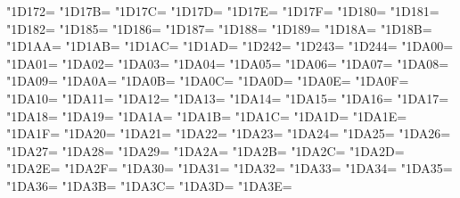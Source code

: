 \XeTeXcharclass"1D172=\KclassCM
\XeTeXcharclass"1D17B=\KclassCM
\XeTeXcharclass"1D17C=\KclassCM
\XeTeXcharclass"1D17D=\KclassCM
\XeTeXcharclass"1D17E=\KclassCM
\XeTeXcharclass"1D17F=\KclassCM
\XeTeXcharclass"1D180=\KclassCM
\XeTeXcharclass"1D181=\KclassCM
\XeTeXcharclass"1D182=\KclassCM
\XeTeXcharclass"1D185=\KclassCM
\XeTeXcharclass"1D186=\KclassCM
\XeTeXcharclass"1D187=\KclassCM
\XeTeXcharclass"1D188=\KclassCM
\XeTeXcharclass"1D189=\KclassCM
\XeTeXcharclass"1D18A=\KclassCM
\XeTeXcharclass"1D18B=\KclassCM
\XeTeXcharclass"1D1AA=\KclassCM
\XeTeXcharclass"1D1AB=\KclassCM
\XeTeXcharclass"1D1AC=\KclassCM
\XeTeXcharclass"1D1AD=\KclassCM
\XeTeXcharclass"1D242=\KclassCM
\XeTeXcharclass"1D243=\KclassCM
\XeTeXcharclass"1D244=\KclassCM
\XeTeXcharclass"1DA00=\KclassCM
\XeTeXcharclass"1DA01=\KclassCM
\XeTeXcharclass"1DA02=\KclassCM
\XeTeXcharclass"1DA03=\KclassCM
\XeTeXcharclass"1DA04=\KclassCM
\XeTeXcharclass"1DA05=\KclassCM
\XeTeXcharclass"1DA06=\KclassCM
\XeTeXcharclass"1DA07=\KclassCM
\XeTeXcharclass"1DA08=\KclassCM
\XeTeXcharclass"1DA09=\KclassCM
\XeTeXcharclass"1DA0A=\KclassCM
\XeTeXcharclass"1DA0B=\KclassCM
\XeTeXcharclass"1DA0C=\KclassCM
\XeTeXcharclass"1DA0D=\KclassCM
\XeTeXcharclass"1DA0E=\KclassCM
\XeTeXcharclass"1DA0F=\KclassCM
\XeTeXcharclass"1DA10=\KclassCM
\XeTeXcharclass"1DA11=\KclassCM
\XeTeXcharclass"1DA12=\KclassCM
\XeTeXcharclass"1DA13=\KclassCM
\XeTeXcharclass"1DA14=\KclassCM
\XeTeXcharclass"1DA15=\KclassCM
\XeTeXcharclass"1DA16=\KclassCM
\XeTeXcharclass"1DA17=\KclassCM
\XeTeXcharclass"1DA18=\KclassCM
\XeTeXcharclass"1DA19=\KclassCM
\XeTeXcharclass"1DA1A=\KclassCM
\XeTeXcharclass"1DA1B=\KclassCM
\XeTeXcharclass"1DA1C=\KclassCM
\XeTeXcharclass"1DA1D=\KclassCM
\XeTeXcharclass"1DA1E=\KclassCM
\XeTeXcharclass"1DA1F=\KclassCM
\XeTeXcharclass"1DA20=\KclassCM
\XeTeXcharclass"1DA21=\KclassCM
\XeTeXcharclass"1DA22=\KclassCM
\XeTeXcharclass"1DA23=\KclassCM
\XeTeXcharclass"1DA24=\KclassCM
\XeTeXcharclass"1DA25=\KclassCM
\XeTeXcharclass"1DA26=\KclassCM
\XeTeXcharclass"1DA27=\KclassCM
\XeTeXcharclass"1DA28=\KclassCM
\XeTeXcharclass"1DA29=\KclassCM
\XeTeXcharclass"1DA2A=\KclassCM
\XeTeXcharclass"1DA2B=\KclassCM
\XeTeXcharclass"1DA2C=\KclassCM
\XeTeXcharclass"1DA2D=\KclassCM
\XeTeXcharclass"1DA2E=\KclassCM
\XeTeXcharclass"1DA2F=\KclassCM
\XeTeXcharclass"1DA30=\KclassCM
\XeTeXcharclass"1DA31=\KclassCM
\XeTeXcharclass"1DA32=\KclassCM
\XeTeXcharclass"1DA33=\KclassCM
\XeTeXcharclass"1DA34=\KclassCM
\XeTeXcharclass"1DA35=\KclassCM
\XeTeXcharclass"1DA36=\KclassCM
\XeTeXcharclass"1DA3B=\KclassCM
\XeTeXcharclass"1DA3C=\KclassCM
\XeTeXcharclass"1DA3D=\KclassCM
\XeTeXcharclass"1DA3E=\KclassCM
